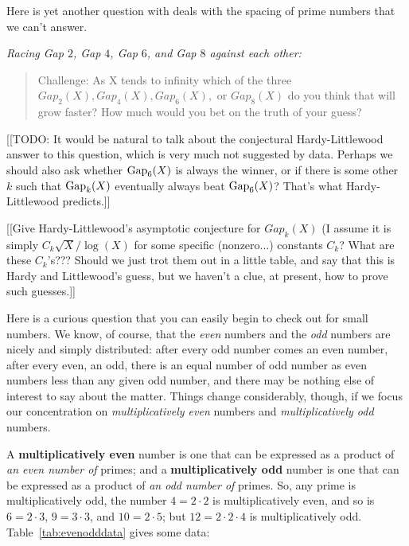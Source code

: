 \documentclass[11pt]{article}
\theoremstyle{plain}
\theoremstyle{definition}
\numberwithin{equation}{section}
\numberwithin{figure}{section}
\numberwithin{table}{section}
\begin{document}
   \bigskip
   
   Here is yet another question with deals with
the spacing of prime numbers that we can't answer.
  
{\em Racing Gap $2$,  Gap $4$, Gap $6$, and Gap $8$ against each other:} 
  
\begin{quote}
  Challenge: As X tends to infinity which of the three $Gap_2(X),
  Gap_4(X), Gap_6(X),$ or $Gap_8(X)$ do you think that will grow
  faster? How much would you bet on the truth of your guess?
\end{quote}
  
[[TODO: It would be natural to talk about the
conjectural Hardy-Littlewood answer to this question, which is very
much not suggested by data.  Perhaps we should also
ask whether ${\rm Gap}_6(X)$ is always the winner, or if there is some
other $k$ such that ${\rm Gap}_k(X)$ eventually always beat ${\rm
  Gap}_6(X)$?  That's what Hardy-Littlewood predicts.]]

[[Give Hardy-Littlewood's asymptotic conjecture for $Gap_k(X)$ (I
assume it is simply $C_k{\sqrt X}/\log(X)$ for some specific
(nonzero...)  constants $C_k$? What are these $C_k$'s???  Should we
just trot them out in a little table, and say that this is Hardy and
Littlewood's guess, but we haven't a clue, at present, how to prove
such guesses.]]


Here is a curious question that you can easily begin to check out for
small numbers. We know, of course, that the {\em even} numbers and the
{\em odd} numbers are nicely and simply distributed: after every odd
number comes an even number, after every even, an odd, there is an
equal number of odd number as even numbers less than any given odd
number, and there may be nothing else of interest to say about the
matter.  Things change considerably, though, if we focus our
concentration on {\em multiplicatively even} numbers and {\em
  multiplicatively odd} numbers.
  
  
A {\bf multiplicatively even} number is one that can be expressed as a
product of {\em an even number of} primes; and a {\bf multiplicatively
  odd} number is one that can be expressed as a product of {\em an odd
  number of} primes.  So, any prime is multiplicatively odd, the
number $4 = 2\cdot 2$ is multiplicatively even, and so is $6=2\cdot
3$, $9=3\cdot 3$, and $10= 2\cdot 5$; but $12=2\cdot 2\cdot 4$ is
multiplicatively odd.  Table~\ref{tab:evenodddata} gives some data:
   
\end{document}
